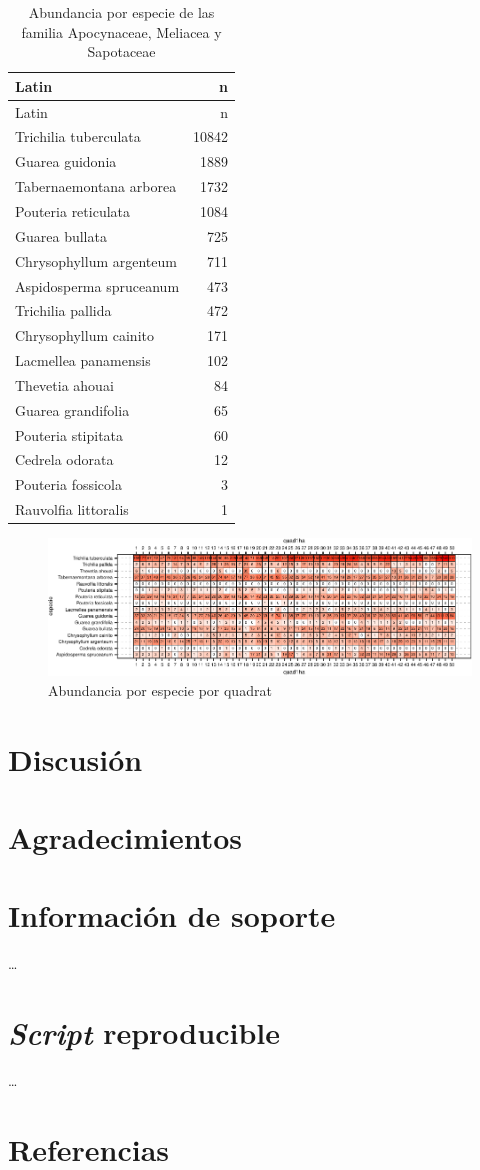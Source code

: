\documentclass[11pt,]{article}
\begin{document}
\begin{longtable}[]{@{}lr@{}}
\caption{\label{tab:abun_sp}Abundancia por especie de las familia
Apocynaceae, Meliacea y Sapotaceae}\tabularnewline
\toprule
Latin & n\tabularnewline
\midrule
\endfirsthead
\toprule
Latin & n\tabularnewline
\midrule
\endhead
Trichilia tuberculata & 10842\tabularnewline
Guarea guidonia & 1889\tabularnewline
Tabernaemontana arborea & 1732\tabularnewline
Pouteria reticulata & 1084\tabularnewline
Guarea bullata & 725\tabularnewline
Chrysophyllum argenteum & 711\tabularnewline
Aspidosperma spruceanum & 473\tabularnewline
Trichilia pallida & 472\tabularnewline
Chrysophyllum cainito & 171\tabularnewline
Lacmellea panamensis & 102\tabularnewline
Thevetia ahouai & 84\tabularnewline
Guarea grandifolia & 65\tabularnewline
Pouteria stipitata & 60\tabularnewline
Cedrela odorata & 12\tabularnewline
Pouteria fossicola & 3\tabularnewline
Rauvolfia littoralis & 1\tabularnewline
\bottomrule
\end{longtable}

\begin{figure}
\centering
\includegraphics{test_RMD_files/figure-latex/unnamed-chunk-3-1.pdf}
\caption{\label{fig:abun_sp_q}Abundancia por especie por quadrat}
\end{figure}

\hypertarget{discusiuxf3n}{%
\section{Discusión}\label{discusiuxf3n}}

\hypertarget{agradecimientos}{%
\section{Agradecimientos}\label{agradecimientos}}

\hypertarget{informaciuxf3n-de-soporte}{%
\section{Información de soporte}\label{informaciuxf3n-de-soporte}}

\ldots

\hypertarget{script-reproducible}{%
\section{\texorpdfstring{\emph{Script}
reproducible}{Script reproducible}}\label{script-reproducible}}

\ldots

\hypertarget{referencias}{%
\section{Referencias}\label{referencias}}




\newpage
\singlespacing 
\end{document}
